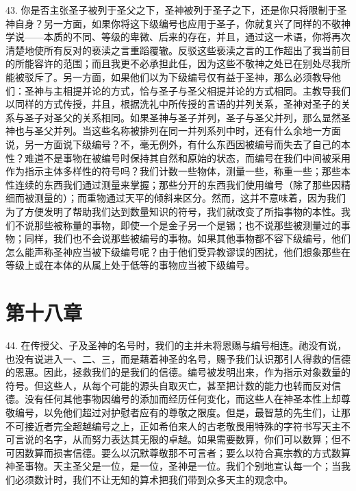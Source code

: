 43. 你是否主张圣子被列于圣父之下，圣神被列于圣子之下，还是你只将限制于圣神自身？另一方面，如果你将这下级编号也应用于圣子，你就复兴了同样的不敬神学说——本质的不同、等级的卑微、后来的存在，并且，通过这一术语，你将再次清楚地使所有反对的亵渎之言重蹈覆辙。反驳这些亵渎之言的工作超出了我当前目的所能容许的范围；而且我更不必承担此任，因为这些不敬神之处已在别处尽我所能被驳斥了。另一方面，如果他们以为下级编号仅有益于圣神，那么必须教导他们：圣神与主相提并论的方式，恰与圣子与圣父相提并论的方式相同。主教导我们以同样的方式传授，并且，根据洗礼中所传授的言语的并列关系，圣神对圣子的关系与圣子对圣父的关系相同。如果圣神与圣子并列，圣子与圣父并列，那么显然圣神也与圣父并列。当这些名称被排列在同一并列系列中时，还有什么余地一方面说，另一方面说下级编号？不，毫无例外，有什么东西因被编号而失去了自己的本性？难道不是事物在被编号时保持其自然和原始的状态，而编号在我们中间被采用作为指示主体多样性的符号吗？我们计数一些物体，测量一些，称重一些；那些本性连续的东西我们通过测量来掌握；那些分开的东西我们使用编号（除了那些因精细而被测量的）；而重物通过天平的倾斜来区分。然而，这并不意味着，因为我们为了方便发明了帮助我们达到数量知识的符号，我们就改变了所指事物的本性。我们不说那些被称量的事物，即使一个是金子另一个是锡；也不说那些被测量过的事物；同样，我们也不会说那些被编号的事物。如果其他事物都不容下级编号，他们怎么能声称圣神应当被下级编号呢？由于他们受异教谬误的困扰，他们想象那些在等级上或在本体的从属上处于低等的事物应当被下级编号。\par


\section{第十八章}

\par

44. 在传授父、子及圣神的名号时，我们的主并未将恩赐与编号相连。祂没有说，也没有说进入一、二、三，而是藉着神圣的名号，赐予我们认识那引人得救的信德的恩惠。因此，拯救我们的是我们的信德。编号被发明出来，作为指示对象数量的符号。但这些人，从每个可能的源头自取灭亡，甚至把计数的能力也转而反对信德。没有任何其他事物因编号的添加而经历任何变化，而这些人在神圣本性上却尊敬编号，以免他们超过对护慰者应有的尊敬之限度。但是，最智慧的先生们，让那不可接近者完全超越编号之上，正如希伯来人的古老敬畏用特殊的字符书写天主不可言说的名字，从而努力表达其无限的卓越。如果需要数算，你们可以数算；但不可因数算而损害信德。要么以沉默尊敬那不可言者；要么以符合真宗教的方式数算神圣事物。天主圣父是一位，是一位，圣神是一位。我们个别地宣认每一个；当我们必须数计时，我们不让无知的算术把我们带到众多天主的观念中。\par


